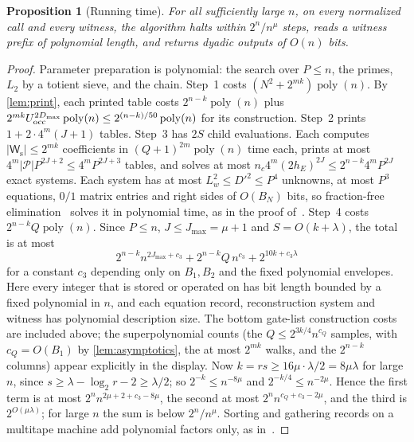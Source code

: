 \documentclass[11pt,letterpaper]{article}
\newtheorem{proposition}[theorem]{Proposition}
\theoremstyle{definition}
\theoremstyle{remark}
\newcommand{\poly}{\operatorname{poly}}
\newcommand{\cP}{\mathcal P}
\newcommand{\Ws}{\mathsf W_{\mathrm s}}
\newcommand{\lgx}{\log_2}
\begin{document}
\begin{proposition}[Running time]\label{prop:time}
For all sufficiently large \(n\), on every normalized call and every
witness, the algorithm halts within \(2^n/n^{\mu}\) steps, reads a
witness prefix of polynomial length, and returns dyadic outputs of
\(O(n)\) bits.
\end{proposition}
\begin{proof}
Parameter preparation is polynomial: the search over \(P\le n\), the
primes, \(L_2\) by a totient sieve, and the chain. Step~1 costs
\((N^2+2^{mk})\poly(n)\). By \cref{lem:print}, each printed table costs
\(2^{n-k}\poly(n)\) plus
\(2^{mk}U_{\rm occ}^{2D_{\max}}\poly(n)\le2^{(n-k)/50}\poly(n)\) for its
construction. Step~2 prints \(1+2\cdot4^m(J+1)\) tables. Step~3 has
\(2S\) child evaluations. Each computes \(|\Ws|\le2^{mk}\) coefficients in
\((Q+1)^{2m}\poly(n)\) time each, prints at most
\(4^m|\cP|P^{2J+2}\le4^mP^{2J+3}\) tables, and solves at most
\(n_c4^m(2h_E)^{2J}\le2^{n-k}4^mP^{2J}\) exact systems. Each system has
at most \(L_w^2\le D'^2\le P^4\) unknowns, at most \(P^3\) equations,
\(0/1\) matrix entries and right sides of \(O(B_N)\) bits, so
fraction-free elimination~\cite{Bareiss68} solves it in polynomial
time, as in the proof of~\cite[Proposition~8.3]{NagCG}. Step~4 costs
\(2^{n-k}Q\poly(n)\). Since \(P\le n\), \(J\le J_{\max}=\mu+1\) and
\(S=O(k+\lambda)\), the total is at most
\[
 2^{n-k}n^{2J_{\max}+c_3}+2^{n-k}Q\,n^{c_3}+2^{10k+c_3\lambda}
\]
for a constant \(c_3\) depending only on \(B_1,B_2\) and the fixed
polynomial envelopes. Here every integer that is stored or operated on
has bit length bounded by a fixed polynomial in \(n\), and each
equation record, reconstruction system and witness has polynomial
description size. The bottom gate-list construction costs are included
above; the
superpolynomial counts (the \(Q\le2^{3k/4}n^{c_Q}\) samples, with
\(c_Q=O(B_1)\) by \cref{lem:asymptotics}, the at most \(2^{mk}\) walks,
and the \(2^{n-k}\) columns) appear explicitly in the display. Now
\(k=rs\ge16\mu\cdot\lambda/2=8\mu\lambda\) for large \(n\), since
\(s\ge\lambda-\lgx r-2\ge\lambda/2\); so \(2^{-k}\le n^{-8\mu}\) and
\(2^{-k/4}\le n^{-2\mu}\). Hence the first term is at most
\(2^nn^{2\mu+2+c_3-8\mu}\), the second at most \(2^nn^{c_Q+c_3-2\mu}\),
and the third is \(2^{O(\mu\lambda)}\); for large \(n\) the sum is below
\(2^n/n^{\mu}\). Sorting and gathering records on a multitape machine
add polynomial factors only, as in~\cite[Proposition~8.3]{NagCG}.
\end{proof}
\end{document}
